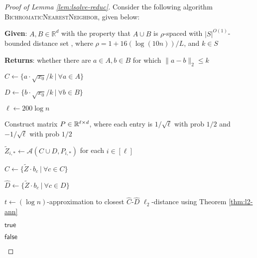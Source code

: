 \begin{proof}[Proof of Lemma \ref{lem:lsolve-reduc}]
Consider the following algorithm \textsc{BichromaticNearestNeighbor}, given below:
\begin{algorithm}\caption{  }\label{alg:bichromatic_nearest_neighor_proj}
\begin{algorithmic}[1]
 

    \State \textbf{Given}: $A,B\in \mathbb{R}^d$ with the property that $A\cup B$ is $\rho$-spaced with $|S|^{O(1)}$-bounded distance set
    , where $\rho = 1 + 16(\log (10 n ))/L$, and $k\in S$
    
    \State \textbf{Returns}: whether there are $a\in A, b\in B$ for which $\|a - b\|_2 \le k$
    
    \State $C\gets \{a \cdot \sqrt{x_0} / k ~|~ \forall a\in A\}$ 
    
    \State $D\gets \{b \cdot \sqrt{x_0} / k ~|~ \forall b\in B\}$
    
    \State $\ell\gets 200\log n$

    \State Construct matrix $P \in {\mathbb R}^{\ell \times d}$, where each entry is $1/\sqrt{\ell}$ with prob $1/2$ and $-1/\sqrt{\ell}$ with prob $1/2$ 
    
    \State $\tilde{Z}_{i,*} \gets \mathcal A( C \cup D , P_{i,*} )$ for each $i\in [\ell]$ 
    
    \State $\widehat{C}\gets \{\tilde{Z} \cdot b_c ~|~ \forall c\in C\}$ 
    
    \State $\widehat{D}\gets \{\tilde{Z} \cdot b_c ~|~ \forall c\in D\}$
    
    \State $t\gets (\log n)$-approximation to closest $\widehat{C}$-$\widehat{D}$ $\ell_2$-distance using Theorem \ref{thm:l2-ann}
    
        
        \State \Return $\mathsf{true}$
        
    \Else
    
        \State \Return $\mathsf{false}$
        
    \EndIf

\EndProcedure
\end{algorithmic}
\end{algorithm}


\end{proof}
